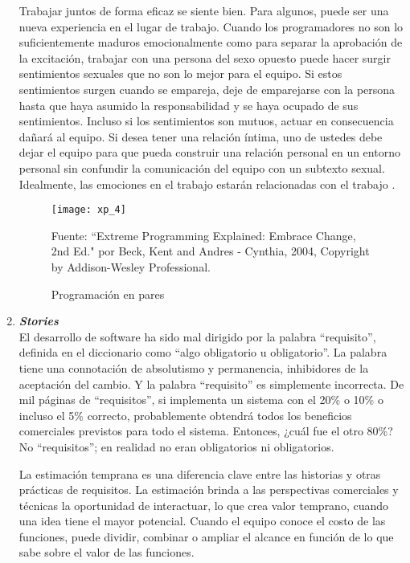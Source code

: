 \begin{spacing}{1.5}
\begin{enumerate}
				Trabajar juntos de forma eficaz se siente bien. Para algunos, puede ser una nueva experiencia en el lugar de trabajo. Cuando los programadores no son lo suficientemente maduros emocionalmente como para separar la aprobación de la excitación, trabajar con una persona del sexo opuesto puede hacer surgir sentimientos sexuales que no son lo mejor para el equipo. Si estos sentimientos surgen cuando se empareja, deje de emparejarse con la persona hasta que haya asumido la responsabilidad y se haya ocupado de sus sentimientos. Incluso si los sentimientos son mutuos, actuar en consecuencia dañará al equipo. Si desea tener una relación íntima, uno de ustedes debe dejar el equipo para que pueda construir una relación personal en un entorno personal sin confundir la comunicación del equipo con un subtexto sexual. Idealmente, las emociones en el trabajo estarán relacionadas con el trabajo \cite{chap2_extreme_programming}.
				
				\begin{figure}[H]
					\centering
					\texttt{[image: xp\_4]}
					\caption {\centering \small{Programaci\'{o}n en pares}} \label{figure:chaperII_5}
					\small {Fuente: ``Extreme Programming Explained: Embrace Change, 2nd Ed." por Beck, Kent and Andres - Cynthia, 2004, Copyright by Addison-Wesley Professional.}
				\end{figure}
				
				\item \textit{\textbf{Stories}}\\
				El desarrollo de software ha sido mal dirigido por la palabra ``requisito'', definida en el diccionario como ``algo obligatorio u obligatorio''. La palabra tiene una connotación de absolutismo y permanencia, inhibidores de la aceptación del cambio. Y la palabra ``requisito'' es simplemente incorrecta. De mil páginas de ``requisitos'', si implementa un sistema con el 20\% o 10\% o incluso el 5\% correcto, probablemente obtendrá todos los beneficios comerciales previstos para todo el sistema. Entonces, ¿cuál fue el otro 80\%? No ``requisitos''; en realidad no eran obligatorios ni obligatorios.
				
				La estimación temprana es una diferencia clave entre las historias y otras prácticas de requisitos. La estimación brinda a las perspectivas comerciales y técnicas la oportunidad de interactuar, lo que crea valor temprano, cuando una idea tiene el mayor potencial. Cuando el equipo conoce el costo de las funciones, puede dividir, combinar o ampliar el alcance en función de lo que sabe sobre el valor de las funciones.
				

\end{enumerate}
\end{spacing}
